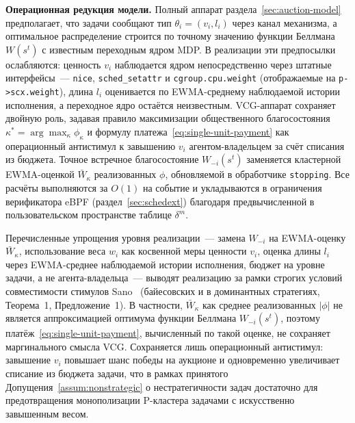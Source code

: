 \documentclass[14pt, oneside]{extbook}
\begin{document}
        \textbf{Операционная редукция модели.}
        Полный аппарат раздела~\ref{sec:auction-model} предполагает,
        что задачи сообщают тип $\theta_i = (v_i, l_i)$ через канал
        механизма, а оптимальное распределение строится по точному
        значению функции Беллмана $W(s^t)$ с известным переходным
        ядром MDP. В реализации эти предпосылки ослабляются:
        ценность $v_i$ наблюдается ядром непосредственно через
        штатные интерфейсы~---
        \texttt{nice}, \texttt{sched\_setattr} и
        \texttt{cgroup.cpu.weight} (отображаемые на
        \texttt{p->scx.weight}), длина $l_i$ оценивается по
        EWMA-среднему наблюдаемой истории исполнения, а переходное
        ядро остаётся неизвестным. VCG-аппарат сохраняет двойную роль,
        задавая правило максимизации общественного благосостояния
        $\kappa^* = \arg\max_\kappa \phi_\kappa$ и формулу
        платежа~\eqref{eq:single-unit-payment} как операционный
        антистимул к завышению $v_i$ агентом-владельцем за счёт
        списания из бюджета. Точное встречное благосостояние
        $W_{-i}(s^t)$ заменяется кластерной EWMA-оценкой
        $\bar W_\kappa$ реализованных $\phi$, обновляемой в
        обработчике \texttt{stopping}. Все расчёты выполняются
        за $O(1)$ на событие и укладываются в ограничения
        верификатора eBPF (раздел~\ref{sec:schedext}) благодаря
        предвычисленной в пользовательском пространстве таблице
        $\delta^m$.

        Перечисленные упрощения уровня реализации~---
        замена $W_{-i}$ на EWMA-оценку $\bar W_\kappa$,
        использование веса $w_i$ как косвенной меры ценности
        $v_i$, оценка длины $l_i$ через EWMA-среднее
        наблюдаемой истории исполнения,
        бюджет на уровне задачи, а не агента-владельца~---
        выводят реализацию за рамки строгих условий
        совместимости стимулов Sano~\cite{sano} (байесовских
        и в доминантных стратегиях, Теорема~1, Предложение~1). В частности, $\bar W_\kappa$ как среднее
        реализованных $|\phi|$ не является аппроксимацией
        оптимума функции Беллмана $W_{-i}(s^t)$, поэтому
        платёж~\eqref{eq:single-unit-payment}, вычисленный по
        такой оценке, не сохраняет маргинального смысла VCG.
        Сохраняется лишь операционный антистимул: завышение
        $v_i$ повышает шанс победы на аукционе и одновременно
        увеличивает списание из бюджета задачи, что в рамках
        принятого Допущения~\ref{assum:nonstrategic} о
        нестратегичности задач достаточно для предотвращения
        монополизации P-кластера задачами с искусственно
        завышенным весом.
\end{document}
